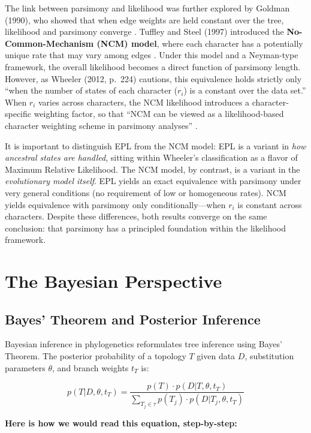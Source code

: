The link between parsimony and likelihood was further explored by Goldman (1990), who showed that when edge weights are held constant over the tree, likelihood and parsimony converge \parencite{goldman1990}. Tuffley and Steel (1997) introduced the \textbf{No-Common-Mechanism (NCM) model}, where each character has a potentially unique rate that may vary among edges \parencite{tuffley1997}. Under this model and a Neyman-type framework, the overall likelihood becomes a direct function of parsimony length. However, as Wheeler (2012, p.~224) cautions, this equivalence holds strictly only ``when the number of states of each character ($r_i$) is a constant over the data set.'' When $r_i$ varies across characters, the NCM likelihood introduces a character-specific weighting factor, so that ``NCM can be viewed as a likelihood-based character weighting scheme in parsimony analyses'' \parencite{wheeler2012}.

It is important to distinguish EPL from the NCM model: EPL is a variant in \textit{how ancestral states are handled}, sitting within Wheeler's classification as a flavor of Maximum Relative Likelihood. The NCM model, by contrast, is a variant in the \textit{evolutionary model itself}. EPL yields an exact equivalence with parsimony under very general conditions (no requirement of low or homogeneous rates). NCM yields equivalence with parsimony only conditionally---when $r_i$ is constant across characters. Despite these differences, both results converge on the same conclusion: that parsimony has a principled foundation within the likelihood framework.

\section{The Bayesian Perspective}

\subsection{Bayes' Theorem and Posterior Inference}

Bayesian inference in phylogenetics reformulates tree inference using Bayes' Theorem. The posterior probability of a topology $T$ given data $D$, substitution parameters $\theta$, and branch weights $t_T$ is:

$$p(T|D, \theta, t_T) = \frac{p(T) \cdot p(D|T, \theta, t_T)}{\sum_{T_j \in \tau} p(T_j) \cdot p(D|T_j, \theta, t_T)}$$

\textbf{Here is how we would read this equation, step-by-step:}

